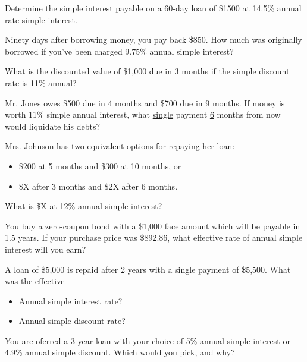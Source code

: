 \documentclass[addpoints, 12pt]{exam}
\begin{document}
\begin{questions}

    \question Determine the simple interest payable on a 60-day loan of \$1500 at 14.5\% annual rate
    simple interest.
    \vspace{2in}

    \question Ninety days after borrowing money, you pay back \$850.  How much was originally borrowed
    if you've been charged 9.75\% annual simple interest?
    \vspace{2in}

    \question What is the discounted value of \$1,000 due in 3 months if the simple discount rate is
    11\% annual?
    \vspace{2in}

    \question Mr. Jones owes \$500 due in 4 months and \$700 due in 9 months.  If money is worth
    11\% simple annual interest, what \underline{single} payment \underline{6}  months from now would liquidate his debts?
    \vspace{2in}

    \question Mrs. Johnson has two equivalent options for repaying her loan:
    \begin{itemize}
        \item \$200 at 5 months and \$300 at 10 months, or
        \item \$X after 3 months and \$2X after 6 months.
    \end{itemize}
    What is \$X at 12\% annual simple interest?
    \vspace{1.5in}

    \question You buy a zero-coupon bond with a \$1,000 face amount which will be payable in
    1.5 years.
    If your purchase price was \$892.86, what effective rate of annual simple interest will you earn?
    \vspace{1.5in}

    \question A loan of \$5,000 is repaid after 2 years with a single payment of \$5,500.
    What was the effective
    \begin{itemize}
        \item Annual simple interest rate?
        \item Annual simple discount rate?
    \end{itemize}
    \vspace{1.5in}

    \question You are oferred a 3-year loan with your choice of 5\% annual simple interest or
    4.9\% annual simple discount.  Which would you pick, and why?

\end{questions}
\end{document}

